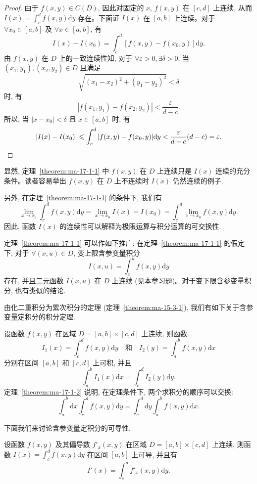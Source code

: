 \begin{proof}
由于 $f(x,y)\in C(D)$, 因此对固定的 $x$, $f(x,y)$ 在 $[c,d]$ 上连续, 从而 $I(x)=\int_c^d f(x,y)\mathrm dy$ 存在。下面证 $I(x)$ 在 $[a,b]$ 上连续。对于 $\forall x_0\in[a,b]$ 及 $\forall x\in[a,b]$, 有
\[
  I(x)-I(x_0)=\int_c^d [f(x,y)-f(x_0,y)]\mathrm dy.
\]
由 $f(x,y)$ 在 $D$ 上的一致连续性知, 对于 $\forall\varepsilon>0,\exists\delta>0$, 当 $(x_1,y_1),(x_2,y_2)\in D$ 且满足
\[
  \sqrt{(x_1-x_2)^2+(y_1-y_2)^2}<\delta
\]
时, 有
\[
  |f(x_1,y_1)-f(x_2,y_2)|<\frac{\varepsilon}{d-c}.
\]
所以, 当 $|x-x_0|<\delta$ 且 $x\in[a,b]$ 时, 有
\[
  |I(x)-I(x_0)|
  \leqslant \int_c^d |f(x,y)-f(x_0,y)|\mathrm dy
  < \frac{\varepsilon}{d-c}(d-c)=\varepsilon.
\qedhere
\]
\end{proof}


显然, 定理~\ref{theorem:ma-17-1-1} 中 $f(x,y)$ 在 $D$ 上连续只是 $I(x)$ 连续的充分条件。读者容易举出 $f(x,y)$ 在 $D$ 上不连续时 $I(x)$ 仍然连续的例子.

另外, 在定理~\ref{theorem:ma-17-1-1} 的条件下, 我们有
\[
  \lim_{x\to x_0}\int_c^d f(x,y)\mathrm dy
  =\lim_{x\to x_0} I(x)
  =I(x_0)
  =\int_c^d \lim_{x\to x_0} f(x,y)\mathrm dy.
\]
因此, 函数 $I(x)$ 的连续性可以解释为极限运算与积分运算的可交换性.

\begin{remark}\label{remark:ma-17-source-3}
定理~\ref{theorem:ma-17-1-1} 可以作如下推广: 在定理~\ref{theorem:ma-17-1-1} 的假定下, 对于 $\forall(x,u)\in D$, 变上限含参变量积分
\[
  I(x,u)=\int_c^u f(x,y)\mathrm dy
\]
存在, 并且二元函数 $I(x,u)$ 在 $D$ 上连续 (见本章习题)。对于变下限含参变量积分, 也有类似的结论.
\end{remark}

由化二重积分为累次积分的定理 (定理~\ref{theorem:ma-15-3-1}), 我们有如下关于含参变量定积分的积分定理.

\begin{theorem}\label{theorem:ma-17-1-2}
设函数 $f(x,y)$ 在区域 $D=[a,b]\times[c,d]$ 上连续, 则函数
\[
  I_1(x)=\int_c^d f(x,y)\mathrm dy
  \quad\text{和}\quad
  I_2(y)=\int_a^b f(x,y)\mathrm dx
\]
分别在区间 $[a,b]$ 和 $[c,d]$ 上可积, 并且
\[
  \int_a^b I_1(x)\mathrm dx=\int_c^d I_2(y)\mathrm dy.
\]
定理~\ref{theorem:ma-17-1-2} 说明, 在定理条件下, 两个求积分的顺序可以交换:
\[
  \int_a^b \mathrm dx\int_c^d f(x,y)\mathrm dy
  =
  \int_c^d \mathrm dy\int_a^b f(x,y)\mathrm dx.
\]
\end{theorem}

下面我们来讨论含参变量定积分的可导性.

\begin{theorem}\label{theorem:ma-17-1-3}
设函数 $f(x,y)$ 及其偏导数 $f'_x(x,y)$ 在区域 $D=[a,b]\times[c,d]$ 上连续, 则函数 $I(x)=\int_c^d f(x,y)\mathrm dy$ 在区间 $[a,b]$ 上可导, 并且有
\[
  I'(x)=\int_c^d f'_x(x,y)\mathrm dy.
\]
\end{theorem}


